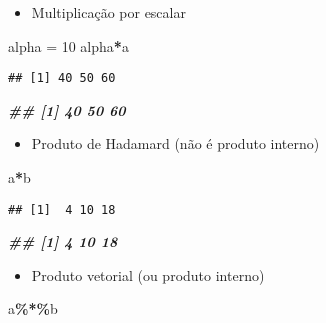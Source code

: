 \documentclass[
]{article}
\newenvironment{Shaded}{\begin{snugshade}}{\end{snugshade}}
\newcommand{\DecValTok}[1]{\textcolor[rgb]{0.00,0.00,0.81}{#1}}
\newcommand{\DocumentationTok}[1]{\textcolor[rgb]{0.56,0.35,0.01}{\textbf{\textit{#1}}}}
\newcommand{\NormalTok}[1]{#1}
\newcommand{\OtherTok}[1]{\textcolor[rgb]{0.56,0.35,0.01}{#1}}
\newcommand{\SpecialCharTok}[1]{\textcolor[rgb]{0.81,0.36,0.00}{\textbf{#1}}}
\providecommand{\tightlist}{%
  \setlength{\itemsep}{0pt}\setlength{\parskip}{0pt}}
\begin{document}
\begin{itemize}
\tightlist
\item
  Multiplicação por escalar
\end{itemize}

\begin{Shaded}
\begin{Highlighting}[]
\NormalTok{alpha }\OtherTok{=} \DecValTok{10}
\NormalTok{alpha}\SpecialCharTok{*}\NormalTok{a}
\end{Highlighting}
\end{Shaded}

\begin{verbatim}
## [1] 40 50 60
\end{verbatim}

\begin{Shaded}
\begin{Highlighting}[]
\DocumentationTok{\#\# [1] 40 50 60}
\end{Highlighting}
\end{Shaded}

\begin{itemize}
\tightlist
\item
  Produto de Hadamard (não é produto interno)
\end{itemize}

\begin{Shaded}
\begin{Highlighting}[]
\NormalTok{a}\SpecialCharTok{*}\NormalTok{b}
\end{Highlighting}
\end{Shaded}

\begin{verbatim}
## [1]  4 10 18
\end{verbatim}

\begin{Shaded}
\begin{Highlighting}[]
\DocumentationTok{\#\# [1] 4 10 18}
\end{Highlighting}
\end{Shaded}

\begin{itemize}
\tightlist
\item
  Produto vetorial (ou produto interno)
\end{itemize}

\begin{Shaded}
\begin{Highlighting}[]
\NormalTok{a}\SpecialCharTok{\%*\%}\NormalTok{b}
\end{Highlighting}
\end{Shaded}
\end{document}
